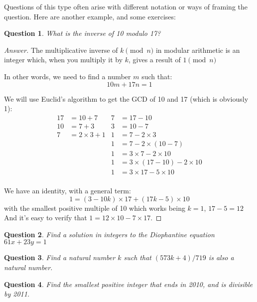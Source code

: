 \documentclass{article}
\newtheorem{question}{Question}
\begin{document}
Questions of this type often arise with different notation or ways of framing the question. Here are
another example, and some exercises:

\begin{question}
What is the inverse of 10 modulo 17?
\end{question}

\begin{proof}[Answer]
	The multiplicative inverse of $k \pmod{n}$ in modular arithmetic is an integer which, when you
	multiply it by $k$, gives a result of $1 \pmod{n}$

	In other words, we need to find a number $m$ such that:
	\[ 10m + 17n = 1 \]

	We will use Euclid's algorithm to get the GCD of 10 and 17 (which is obviously 1):
	\begin{align*}
		17 &= 10 + 7 & 7 &= 17 - 10 \\
		10 &= 7 + 3  & 3 &= 10 - 7 \\
		7 &= 2 \times 3 + 1 & 1 &= 7 - 2 \times 3 \\
		&& 1 &= 7 - 2 \times (10 - 7) \\
		&& 1 &= 3 \times 7 - 2 \times 10 \\
		&& 1 &= 3 \times (17 - 10) - 2 \times 10 \\
		&& 1 &= 3 \times 17 - 5 \times 10 \\
	\end{align*}
	
	We have an identity, with a general term: 
	\[ 1  = (3 - 10k) \times 17 + (17k-5) \times 10 \]
	with the smallest positive multiple of 10 which works being $k=1$, $17-5 = 12$
	And it's easy to verify that $1 = 12\times10 - 7\times17$.
\end{proof}

\begin{question}Find a solution in integers to the Diophantine equation $61x + 23y = 1$\end{question}
\vspace*{\bigskipamount}

\begin{question}Find a natural number $k$ such that $(573k+4)/719$ is also a natural
number.\end{question}
\vspace*{\bigskipamount}

\begin{question}Find the smallest positive integer that ends in 2010, and is divisible by 2011.\end{question}
\vspace*{\bigskipamount}
\end{document}
